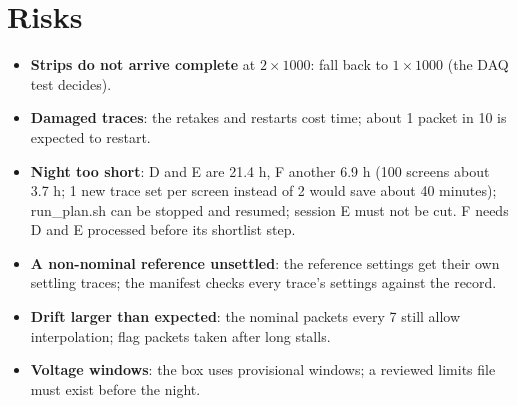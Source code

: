 \documentclass[11pt]{article}
\begin{document}
\section{Risks}
\begin{itemize}
\item \textbf{Strips do not arrive complete} at $2\times1000$: fall back to $1\times1000$ (the DAQ test decides).
\item \textbf{Damaged traces}: the retakes and restarts cost time; about 1 packet in 10 is expected to restart.
\item \textbf{Night too short}: D and E are 21.4 h, F another 6.9 h (100 screens about 3.7 h; 1 new trace set per
  screen instead of 2 would save about 40 minutes); run\_plan.sh can be stopped and resumed; session E
  must not be cut. F needs D and E processed before its shortlist step.
\item \textbf{A non-nominal reference unsettled}: the reference settings get their own settling traces; the manifest
  checks every trace's settings against the record.
\item \textbf{Drift larger than expected}: the nominal packets every 7 still allow interpolation; flag packets taken after
  long stalls.
\item \textbf{Voltage windows}: the box uses provisional windows; a reviewed limits file must exist before the night.
\end{itemize}
\end{document}

